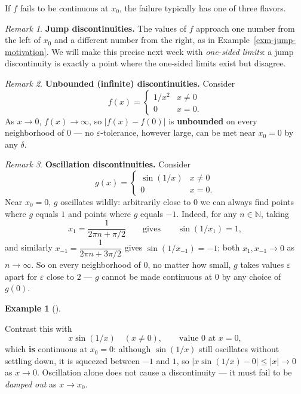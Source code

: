 \documentclass[
  letterpaper,
  DIV=11,
  numbers=noendperiod]{scrreprt}
\theoremstyle{plain}
\theoremstyle{plain}
\theoremstyle{definition}
\theoremstyle{definition}
\theoremstyle{definition}
\newtheorem{example}{Example}[chapter]
\theoremstyle{plain}
\theoremstyle{plain}
\theoremstyle{remark}
\newtheorem{refremark}{Remark}[chapter]
\begin{document}
If \(f\) fails to be continuous at \(x_0\), the failure typically has
one of three flavors.

\begin{refremark}
\textbf{Jump discontinuities.} The values of \(f\) approach one number
from the left of \(x_0\) and a different number from the right, as in
Example~\ref{exm-jump-motivation}. We will make this precise next week
with \emph{one-sided limits}: a jump discontinuity is exactly a point
where the one-sided limits exist but disagree.

\label{rem-jump-discontinuity}

\end{refremark}

\begin{refremark}
\textbf{Unbounded (infinite) discontinuities.} Consider \[
f(x) = \begin{cases} 1/x^2 & x\neq 0 \\ 0 & x = 0. \end{cases}
\] As \(x\to 0\), \(f(x)\to\infty\), so \(\lvert f(x)-f(0) \rvert\) is
\textbf{unbounded} on every neighborhood of \(0\) --- no
\(\varepsilon\)-tolerance, however large, can be met near \(x_0=0\) by
any \(\delta\).

\label{rem-infinite-discontinuity}

\end{refremark}

\begin{refremark}
\textbf{Oscillation discontinuities.} Consider \[
g(x) = \begin{cases} \sin(1/x) & x\neq 0 \\ 0 & x=0. \end{cases}
\] Near \(x_0=0\), \(g\) oscillates wildly: arbitrarily close to \(0\)
we can always find points where \(g\) equals \(1\) and points where
\(g\) equals \(-1\). Indeed, for any \(n\in\mathbb{N}\), taking \[
x_1 = \frac{1}{2\pi n + \pi/2} \qquad\text{gives}\qquad \sin(1/x_1) = 1,
\] and similarly \(x_{-1} = \dfrac{1}{2\pi n + 3\pi/2}\) gives
\(\sin(1/x_{-1}) = -1\); both \(x_1,x_{-1}\to 0\) as \(n\to\infty\). So
on every neighborhood of \(0\), no matter how small, \(g\) takes values
\(\varepsilon\) apart for \(\varepsilon\) close to \(2\) --- \(g\)
cannot be made continuous at \(0\) by any choice of \(g(0)\).

\label{rem-oscillation-discontinuity}

\end{refremark}

\begin{example}[]\protect\hypertarget{exm-x-sin-continuous}{}\label{exm-x-sin-continuous}

\hfill\break
Contrast this with \[
x\sin(1/x) \quad (x\neq 0), \qquad \text{value } 0 \text{ at } x=0,
\] which \textbf{is} continuous at \(x_0=0\): although \(\sin(1/x)\)
still oscillates without settling down, it is squeezed between \(-1\)
and \(1\), so \(\lvert x\sin(1/x) - 0 \rvert \le \lvert x \rvert \to 0\)
as \(x\to 0\). Oscillation alone does not cause a discontinuity --- it
must fail to be \emph{damped out} as \(x\to x_0\).

\end{example}
\end{document}
